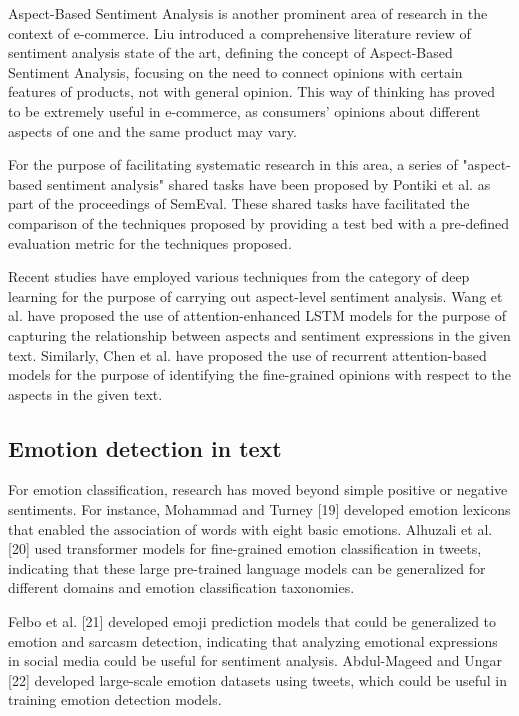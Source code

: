 \documentclass[11pt,a4paper]{article}
\begin{document}
Aspect-Based Sentiment Analysis is another prominent area of research in the context of e-commerce. Liu introduced a comprehensive literature review of sentiment analysis state of the art, defining the concept of Aspect-Based Sentiment Analysis, focusing on the need to connect opinions with certain features of products, not with general opinion. This way of thinking has proved to be extremely useful in e-commerce, as consumers' opinions about different aspects of one and the same product may vary.

For the purpose of facilitating systematic research in this area, a series of "aspect-based sentiment analysis" shared tasks have been proposed by Pontiki et al. as part of the proceedings of SemEval. These shared tasks have facilitated the comparison of the techniques proposed by providing a test bed with a pre-defined evaluation metric for the techniques proposed.

Recent studies have employed various techniques from the category of deep learning for the purpose of carrying out aspect-level sentiment analysis. Wang et al. have proposed the use of attention-enhanced LSTM models for the purpose of capturing the relationship between aspects and sentiment expressions in the given text. Similarly, Chen et al. have proposed the use of recurrent attention-based models for the purpose of identifying the fine-grained opinions with respect to the aspects in the given text.


\subsection{Emotion detection in text}

For emotion classification, research has moved beyond simple positive or negative sentiments. For instance, Mohammad and Turney [19] developed emotion lexicons that enabled the association of words with eight basic emotions. Alhuzali et al. [20] used transformer models for fine-grained emotion classification in tweets, indicating that these large pre-trained language models can be generalized for different domains and emotion classification taxonomies.

Felbo et al. [21] developed emoji prediction models that could be generalized to emotion and sarcasm detection, indicating that analyzing emotional expressions in social media could be useful for sentiment analysis. Abdul-Mageed and Ungar [22] developed large-scale emotion datasets using tweets, which could be useful in training emotion detection models.
\end{document}

